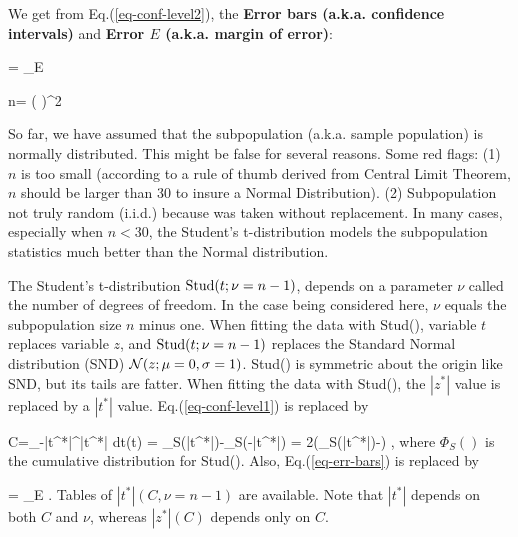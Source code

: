 We get
from Eq.(\ref{eq-conf-level2}),
the {\bf Error bars (a.k.a. confidence intervals)}
and
{\bf Error $E$ (a.k.a. margin of error)}:



\beq
{} =
 \pm
{}_{E}
\label{eq-err-bars}
\eeq

\beq
n= \left(
\right)^2
\eeq

So far, we have assumed
that the subpopulation (a.k.a. sample
population)
is normally distributed.
This might be false
for several reasons.
Some red flags: (1)
$n$ is too small (according to
a rule of thumb derived from
Central Limit Theorem, $n$
should be larger than 30
to insure a Normal Distribution).
(2) Subpopulation not truly random
(i.i.d.)
because was taken
without replacement.
In many cases,
especially
when $n<30$,
the Student's t-distribution
models the subpopulation statistics
much
better than the Normal distribution.


The {\rm Student's t-distribution } ${\rm Stud}(t;
\nu=n-1)$,
depends
on a parameter $\nu$
called the
number of
degrees of freedom.
In the case being considered here,
$\nu$ equals the
subpopulation size $n$
minus one.
When fitting
the data with
Stud(), variable
$t$ replaces
variable $z$,
and ${\rm Stud}(t; \nu=n-1)$
replaces the Standard Normal distribution (SND)
${\cal N}(z; \mu=0, \sigma=1)$.
Stud() is symmetric about
the origin like SND,
but its tails
are fatter.
When fitting the data with Stud(),
the $|z^*|$
value is replaced
by a $|t^*|$ value.
Eq.(\ref{eq-conf-level1})
is replaced by


\beq
C=\int_{-|t^*|}^{|t^*|} dt(t) =
\Phi_S(|t^*|)-\Phi_S(-|t^*|)
=
2\left(\Phi_S(|t^*|)-\;\right)
\label{eq-conf-level1-stu}
\;,
\eeq
where $\Phi_S()$
is the cumulative
distribution for  Stud().
Also, Eq.(\ref{eq-err-bars})
is replaced  by

\beq
{} =
 \pm
{}_{E}
\;.
\eeq
Tables of $|t^*|(C,\nu=n-1)$
are available. Note
that $|t^*|$
depends on both $C$ and $\nu$,
whereas $|z^*|(C)$
depends only on $C$.

